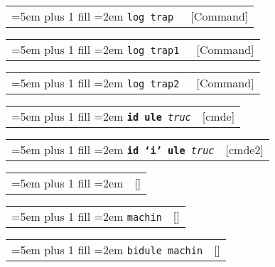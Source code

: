 \documentclass{book}
\newenvironment{GNUTexinfoindented}
  {\begin{list}{}{}
  \item\relax}
  {\end{list}}
\begin{document}
\begin{GNUTexinfoindented}
%

\noindent\begin{tabularx}{\linewidth}{@{}Xr}
\rightskip=5em plus 1 fill
\hangindent=2em
\texttt{log trap \EmbracOn{}\textnormal{\textsl{}}\EmbracOff{}}& [Command]
\end{tabularx}

%

\noindent\begin{tabularx}{\linewidth}{@{}Xr}
\rightskip=5em plus 1 fill
\hangindent=2em
\texttt{log trap1 \EmbracOn{}\textnormal{\textsl{}}\EmbracOff{}}& [Command]
\end{tabularx}

%

\noindent\begin{tabularx}{\linewidth}{@{}Xr}
\rightskip=5em plus 1 fill
\hangindent=2em
\texttt{log trap2 \EmbracOn{}\textnormal{\textsl{}}\EmbracOff{}}& [Command]
\end{tabularx}

%

\noindent\begin{tabularx}{\linewidth}{@{}Xr}
\rightskip=5em plus 1 fill
\hangindent=2em
\texttt{\textbf{id ule} \EmbracOn{}\textnormal{\textsl{truc}}\EmbracOff{}}& [cmde]
\end{tabularx}

%

\noindent\begin{tabularx}{\linewidth}{@{}Xr}
\rightskip=5em plus 1 fill
\hangindent=2em
\texttt{\textbf{id `\texttt{i}'\ ule} \EmbracOn{}\textnormal{\textsl{truc}}\EmbracOff{}}& [cmde2]
\end{tabularx}

%

\noindent\begin{tabularx}{\linewidth}{@{}Xr}
\rightskip=5em plus 1 fill
\hangindent=2em
\texttt{}& []
\end{tabularx}


\noindent\begin{tabularx}{\linewidth}{@{}Xr}
\rightskip=5em plus 1 fill
\hangindent=2em
\texttt{machin}& []
\end{tabularx}

%

\noindent\begin{tabularx}{\linewidth}{@{}Xr}
\rightskip=5em plus 1 fill
\hangindent=2em
\texttt{bidule machin}& []
\end{tabularx}


\end{GNUTexinfoindented}
\end{document}
